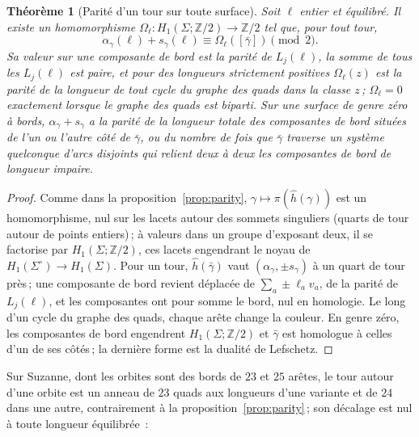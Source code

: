 \documentclass[11pt,a4paper]{article}
\newtheorem{theorem}{Théorème}
\newcommand{\Z}{\mathbb{Z}}
\newcommand{\shift}{s}
\begin{document}
\begin{theorem}[Parité d'un tour sur toute surface]\label{thm:parity-any}
Soit $\ell$ entier et équilibré. Il existe un homomorphisme
$\Omega_\ell\colon H_1(\Sigma; \Z/2) \to \Z/2$ tel que, pour tout tour,
\[
  \alpha_\gamma(\ell) + \shift_\gamma(\ell) \equiv \Omega_\ell([\bar\gamma]) \pmod 2 .
\]
Sa valeur sur une composante de bord est la parité de $L_j(\ell)$, la somme de
tous les $L_j(\ell)$ est paire, et pour des longueurs strictement positives
$\Omega_\ell(z)$ est la parité de la longueur de tout cycle du graphe des
quads dans la classe $z$\,; $\Omega_\ell = 0$ exactement lorsque le graphe des
quads est biparti. Sur une surface de genre zéro à bords, $\alpha_\gamma +
\shift_\gamma$ a la parité de la longueur totale des composantes de bord
situées de l'un ou l'autre côté de $\bar\gamma$, ou du nombre de fois que
$\bar\gamma$ traverse un système quelconque d'arcs disjoints qui relient deux
à deux les composantes de bord de longueur impaire.
\end{theorem}
\begin{proof}
Comme dans la proposition~\ref{prop:parity}, $\gamma \mapsto \pi(\hat
h(\gamma))$ est un homomorphisme, nul sur les lacets autour des sommets
singuliers (quarts de tour autour de points entiers)\,; à valeurs dans un
groupe d'exposant deux, il se factorise par $H_1(\Sigma; \Z/2)$, ces lacets
engendrant le noyau de $H_1(\Sigma^\circ) \to H_1(\Sigma)$. Pour un tour,
$\hat h(\bar\gamma)$ vaut $(\alpha_\gamma, \pm\shift_\gamma)$ à un quart de
tour près\,; une composante de bord revient déplacée de $\sum_a \pm\ell_a
v_a$, de la parité de $L_j(\ell)$, et les composantes ont pour somme le bord,
nul en homologie. Le long d'un cycle du graphe des quads, chaque arête change
la couleur. En genre zéro, les composantes de bord engendrent $H_1(\Sigma;
\Z/2)$ et $\bar\gamma$ est homologue à celles d'un de ses côtés\,; la
dernière forme est la dualité de Lefschetz.
\end{proof}

Sur Suzanne, dont les orbites sont des bords de $23$ et $25$ arêtes, le tour
autour d'une orbite est un anneau de $23$ quads aux longueurs d'une variante
et de $24$ dans une autre, contrairement à la proposition~\ref{prop:parity}\,;
son décalage est nul à toute longueur équilibrée~:
\end{document}
